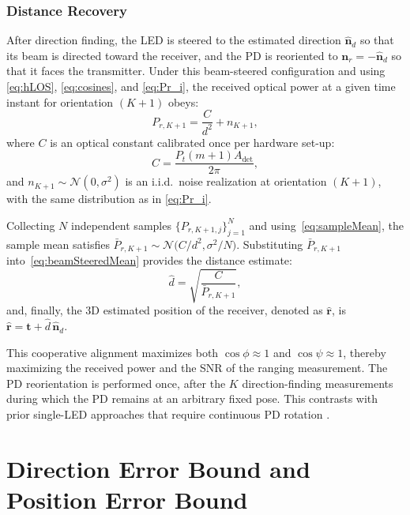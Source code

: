 \documentclass[journal]{IEEEtran}
\newcommand{\added}[1]{{\color{blue}#1}}
\begin{document}
\subsubsection{Distance Recovery}

After direction finding, the LED is \added{steered to the estimated direction $\hat{\mathbf{n}}_{d}$ so that its beam is directed toward the receiver, and the PD is reoriented to $\mathbf{n}_r = -\hat{\mathbf{n}}_d$ so that it faces the transmitter.} Under this beam-steered configuration and using \eqref{eq:hLOS}, \eqref{eq:cosines}, and \eqref{eq:Pr_i}, \added{the received optical power at a given time instant for orientation $(K+1)$ obeys:}
\begin{equation}
P_{r,K+1}= \frac{C}{d^{2}}+n_{K+1},
\label{eq:beamSteeredMean}
\end{equation}
where \(C\) is an optical constant calibrated once per hardware set-up:
\begin{equation}
C = \frac{P_{t}(m+1)A_{\text{det}}}{2\pi},
\label{eq:constant_C}
\end{equation} 
\added{and $n_{K+1}\sim\mathcal{N}(0,\sigma^{2})$ is an i.i.d.\ noise realization at orientation $(K+1)$, with the same distribution as in \eqref{eq:Pr_i}.}

Collecting \(N\) independent samples \(\{P_{r,K+1,j}\}_{j=1}^{N}\) and using~\eqref{eq:sampleMean}, the sample mean satisfies \(\bar P_{r,K+1}\sim\mathcal{N}\bigl(C/d^{2},\sigma^{2}/N\bigr)\). Substituting \(\bar P_{r,K+1}\) into~\eqref{eq:beamSteeredMean} provides the distance estimate:
\begin{equation}
\hat d = \sqrt{\frac{C}{\bar P_{r,K+1}}},
\label{eq:dhat}
\end{equation}
and, finally, the 3D estimated position of the receiver, denoted as \(\hat{\mathbf{r}}\), is $\hat{\mathbf{r}} = \mathbf{t} + \hat d \,\hat{\mathbf{n}}_{d}$.

\added{This cooperative alignment maximizes both $\cos\phi\approx 1$ and $\cos\psi\approx 1$, thereby maximizing the received power and the SNR of the ranging measurement. The PD reorientation is performed once, after the $K$ direction-finding measurements during which the PD remains at an arbitrary fixed pose. This contrasts with prior single-LED approaches that require continuous PD rotation \cite{Liu2022,Wang2024,Shi2025}.}

\section{\added{Direction Error Bound and Position Error Bound}}
\label{sec:PEB}
\end{document}
